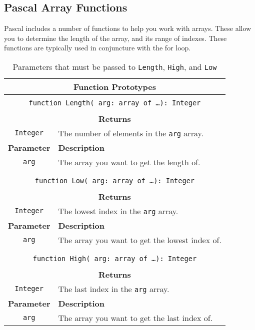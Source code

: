 \subsection{Pascal Array Functions} %
\label{sec:pascal_array_functions}

Pascal includes a number of functions to help you work with arrays. These allow you to determine the length of the array, and its range of indexes. These functions are typically used in conjuncture with the for loop.

\begin{table}[h]
  \centering
  \begin{tabular}{|c|p{9cm}|}
    \hline
    \multicolumn{2}{|c|}{\textbf{Function Prototypes}} \\
    \hline
    \multicolumn{2}{|c|}{} \\
    \multicolumn{2}{|c|}{\texttt{function Length( arg: array of \ldots ): Integer}} \\
    \multicolumn{2}{|c|}{} \\
    \hline
    \multicolumn{2}{|c|}{\textbf{Returns}} \\
    \hline
    \texttt{Integer} & The number of elements in the \texttt{arg} array. \\
    \hline
    \textbf{Parameter} & \textbf{Description} \\
    \hline
    \texttt{ arg } & The array you want to get the length of.\\
    \hline
    \multicolumn{2}{c}{} \\
    \hline
    \multicolumn{2}{|c|}{} \\
    \multicolumn{2}{|c|}{\texttt{function Low( arg: array of \ldots ): Integer}} \\
    \multicolumn{2}{|c|}{} \\
    \hline
    \multicolumn{2}{|c|}{\textbf{Returns}} \\
    \hline
    \texttt{Integer} & The lowest index in the \texttt{arg} array. \\
    \hline
    \textbf{Parameter} & \textbf{Description} \\
    \hline
    \texttt{ arg } & The array you want to get the lowest index of.\\
    \hline
    \multicolumn{2}{c}{} \\
    \hline
    \multicolumn{2}{|c|}{} \\
    \multicolumn{2}{|c|}{\texttt{function High( arg: array of \ldots ): Integer}} \\
    \multicolumn{2}{|c|}{} \\
    \hline
    \multicolumn{2}{|c|}{\textbf{Returns}} \\
    \hline
    \texttt{Integer} & The last index in the \texttt{arg} array. \\
    \hline
    \textbf{Parameter} & \textbf{Description} \\
    \hline
    \texttt{ arg } & The array you want to get the last index of.\\
    \hline
  \end{tabular}
  \caption{Parameters that must be passed to \texttt{Length}, \texttt{High}, and \texttt{Low}}
  \label{tbl:pas-array-fns}
\end{table}


